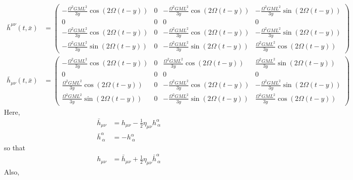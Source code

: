 \documentclass[12pt]{article}
\begin{document}
\begin{align}
\bar{h}^{\mu \nu}(t, \bar{x}) &=
\begin{pmatrix}
- \frac{\Omega^2 G M L^2}{3 y} \cos\left(2 \Omega (t-y)\right) & 0 & - \frac{\Omega^2 G M L^2}{3 y} \cos\left(2 \Omega (t-y)\right) & - \frac{\Omega^2 G M L^2}{3 y} \sin\left(2 \Omega (t-y)\right)\\
0 & 0 & 0 & 0\\
- \frac{\Omega^2 G M L^2}{3 y} \cos\left(2 \Omega (t-y)\right) & 0 & - \frac{\Omega^2 G M L^2}{3 y} \cos\left(2 \Omega (t-y)\right) & - \frac{\Omega^2 G M L^2}{3 y} \sin\left(2 \Omega (t-y)\right)\\
- \frac{\Omega^2 G M L^2}{3 y} \sin\left(2 \Omega (t-y)\right) & 0 & - \frac{\Omega^2 G M L^2}{3 y} \sin\left(2 \Omega (t-y)\right) &  \frac{\Omega^2 G M L^2}{3 y} \cos\left(2 \Omega (t-y)\right)
\end{pmatrix}
\\
\bar{h}_{\mu \nu}(t, \bar{x}) &=
\begin{pmatrix}
- \frac{\Omega^2 G M L^2}{3 y} \cos\left(2 \Omega (t-y)\right) & 0 & \frac{\Omega^2 G M L^2}{3 y} \cos\left(2 \Omega (t-y)\right) & \frac{\Omega^2 G M L^2}{3 y} \sin\left(2 \Omega (t-y)\right)\\
0 & 0 & 0 & 0\\
\frac{\Omega^2 G M L^2}{3 y} \cos\left(2 \Omega (t-y)\right) & 0 & - \frac{\Omega^2 G M L^2}{3 y} \cos\left(2 \Omega (t-y)\right) & - \frac{\Omega^2 G M L^2}{3 y} \sin\left(2 \Omega (t-y)\right)\\
\frac{\Omega^2 G M L^2}{3 y} \sin\left(2 \Omega (t-y)\right) & 0 & - \frac{\Omega^2 G M L^2}{3 y} \sin\left(2 \Omega (t-y)\right) &  \frac{\Omega^2 G M L^2}{3 y} \cos\left(2 \Omega (t-y)\right)
\end{pmatrix}
\end{align}
Here,
\begin{align}
\bar{h}_{\mu \nu} &= h_{\mu \nu} - \frac{1}{2} \eta_{\mu \nu} h^{\alpha}_{~\alpha} \\
\bar{h}^{\alpha}_{~\alpha} &= - h^{\alpha}_{~\alpha}
\end{align}
so that
\begin{align}
h_{\mu \nu} &= \bar{h}_{\mu \nu} + \frac{1}{2} \eta_{\mu \nu} \bar{h}^{\alpha}_{~\alpha}
\end{align}
Also,
\end{document}
